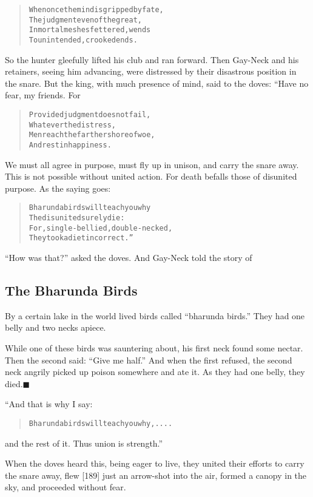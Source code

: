 \documentclass[article, twoside, 14pt]{memoir}
\newcommand{\qed}{\hfill \ensuremath{\blacksquare}}
\renewenvironment{verbatim}{%
\begin{quote}%
\vskip -10pt%
\begin{alltt}\normalfont\large}{\end{alltt}%
\end{quote}%
\vskip -10pt
} %
\begin{document}
\begin{verbatim}
When once the mind is gripped by fate,
The judgment even of the great,
In mortal meshes fettered, wends
To unintended, crooked ends.
\end{verbatim}
So the hunter gleefully lifted his club and ran forward. Then
Gay-Neck and his retainers, seeing him advancing, were distressed
by their disastrous position in the snare. But the king, with much
presence of mind, said to the doves: “Have no fear, my friends.
For

\begin{verbatim}
Provided judgment does not fail,
    Whatever the distress,
Men reach the farther shore of woe,
    And rest in happiness.
\end{verbatim}
We must all agree in purpose, must fly up in unison, and carry the
snare away. This is not possible without united action. For death
befalls those of disunited purpose. As the saying goes:

\begin{verbatim}
Bharunda birds will teach you why
The disunited surely die:
For, single-bellied, double-necked,
They took a diet incorrect.”
\end{verbatim}
``How was that?'' asked the doves. And Gay-Neck told the story of

\subsection{The Bharunda Birds}

\label{s37}

By a certain lake in the world lived birds called
``bharunda birds.'' They had one belly and two necks apiece.

While one of these birds was sauntering about, his first neck found
some nectar. Then the second said: ``Give me half.'' And when the
first refused, the second neck angrily picked up poison somewhere
and ate it. As they had one belly, they died.\hyperref[s37]{\qed}

“And that is why I say:

\begin{verbatim}
    Bharunda birds will teach you why, ....
\end{verbatim}
and the rest of it. Thus union is strength.”

When the doves heard this, being eager to live, they united their
efforts to carry the snare away, flew [189] just an arrow-shot into
the air, formed a canopy in the sky, and proceeded without fear.
\end{document}
